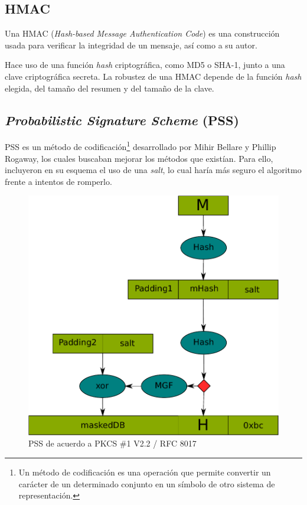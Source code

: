\subsection{HMAC}

\label{HMAC}

Una HMAC (\emph{Hash-based Message Authentication Code}) es una construcción usada para verificar la integridad de un mensaje, así como a su autor.

Hace uso de una función \emph{hash} criptográfica, como MD5 o SHA-1, junto a una clave criptográfica secreta. La robustez de una HMAC depende de la función \emph{hash} elegida, del tamaño del resumen y del tamaño de la clave. \emph{\parencite{Reference31}}

\subsection{\emph{Probabilistic Signature Scheme} (PSS)}

\label{PSS}

PSS es un método de codificación\footnote{Un método de codificación es una operación que permite convertir un carácter de un determinado conjunto en un símbolo de otro sistema de representación.} desarrollado por Mihir Bellare y Phillip Rogaway, los cuales buscaban mejorar los métodos que existían. Para ello, incluyeron en su esquema el uso de una \emph{salt}, lo cual haría más seguro el algoritmo frente a intentos de romperlo. \emph{\parencite{Reference15}}

\begin{figure}[ht]
  \centering
  \includegraphics[scale=0.6]{Figures/PSS}
  \decoRule
  \caption[PSS (Esquema)]{PSS de acuerdo a PKCS \#1 V2.2 / RFC 8017}
  \label{fig:PSS}
\end{figure}

